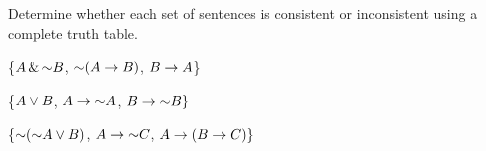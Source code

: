 \noindent\problempart
\label{pr.TT.consistent}
Determine whether each set of sentences is consistent or inconsistent using a complete truth table. 
\begin{earg}
\item \{$A \,\&\, \mathord{\sim} B$, $\mathord{\sim}(A \rightarrow B)$, $B \rightarrow A$\}\vspace{.5ex} %


\item \{$A \vee B$, $A \rightarrow \mathord{\sim} A$, $B \rightarrow \mathord{\sim} B\}$ \vspace{.5ex}%


\item \{$\mathord{\sim}(\mathord{\sim} A \vee B) $, $A \rightarrow \mathord{\sim} C$, $A \rightarrow (B \rightarrow C)\}$\vspace{.5ex} %


\end{earg}

